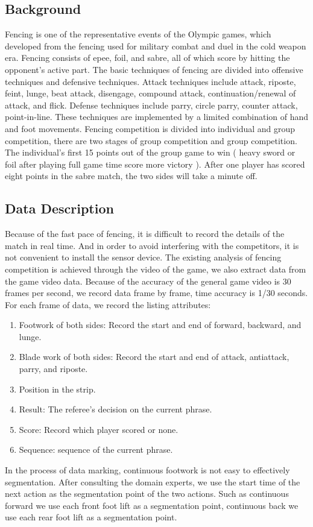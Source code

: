 \documentclass[journal]{vgtc}                %
\begin{document}
\subsection{Background}
Fencing is one of the representative events of the Olympic games, which developed from the fencing used for military combat and duel in the cold weapon era.
Fencing consists of epee, foil, and sabre, all of which score by hitting the opponent's active part.
The basic techniques of fencing are divided into offensive techniques and defensive techniques.
Attack techniques include attack, riposte, feint, lunge, beat attack, disengage, compound attack, continuation/renewal of attack, and flick.
Defense techniques include parry, circle parry, counter attack, point-in-line.
These techniques are implemented by a limited combination of hand and foot movements.
Fencing competition is divided into individual and group competition, there are two stages of group competition and group competition.
The individual's first 15 points out of the group game to win ( heavy sword or foil after playing full game time score more victory ).
After one player has scored eight points in the sabre match, the two sides will take a minute off.


	
\subsection{Data Description}
Because of the fast pace of fencing, it is difficult to record the details of the match in real time.
And in order to avoid interfering with the competitors, it is not convenient to install the sensor device.
The existing analysis of fencing competition is achieved through the video of the game, we also extract data from the game video data.
Because of the accuracy of the general game video is 30 frames per second, we record data frame by frame, time accuracy is 1/30 seconds. For each frame of data, we record the listing attributes:
\begin{enumerate}
	\item Footwork of both sides: Record the start and end of forward, backward, and lunge.
	\item Blade work of both sides: Record the start and end of attack, antiattack, parry, and riposte.
	\item Position in the strip.
	\item Result: The referee's decision on the current phrase.
	\item Score: Record which player scored or none.
	\item Sequence: sequence of the current phrase.	
\end{enumerate} 
In the process of data marking, continuous footwork is not easy to effectively segmentation.
After consulting the domain experts, we use the start time of the next action as the segmentation point of the two actions.
Such as continuous forward we use each front foot lift as a segmentation point, continuous back we use each rear foot lift as a segmentation point.
\end{document}
